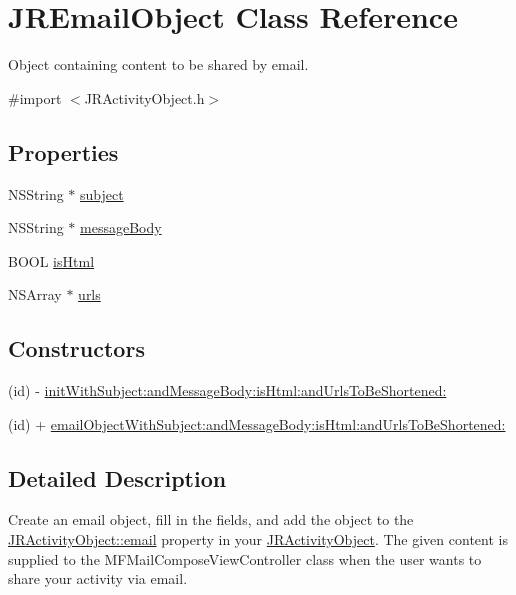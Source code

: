 \hypertarget{interface_j_r_email_object}{
\section{JREmailObject Class Reference}
\label{interface_j_r_email_object}
}


Object containing content to be shared by email.  




{\ttfamily \#import $<$JRActivityObject.h$>$}

\subsection*{Properties}
\begin{DoxyCompactItemize}
\item 
NSString $\ast$ \hyperlink{interface_j_r_email_object_a618a23c34ede4a4eb56ed6cf05d91b64}{subject}
\item 
NSString $\ast$ \hyperlink{interface_j_r_email_object_ad0e6a07cb2aec3cf6eee75d2ace32e7d}{messageBody}
\item 
BOOL \hyperlink{interface_j_r_email_object_af372942f67fba5e93fb2b53f4ee8a3c5}{isHtml}
\item 
NSArray $\ast$ \hyperlink{interface_j_r_email_object_a3f274a24ce4145b46cb5f0cda50378ce}{urls}
\end{DoxyCompactItemize}
\subsection*{Constructors}
\label{_amgrp559a25fdb98a7d1fd1c3771ac568d5e9}
 \begin{DoxyCompactItemize}
\item 
(id) -\/ \hyperlink{interface_j_r_email_object_aa911e84f7b1f7e8c4fd15009dbdc6783}{initWithSubject:andMessageBody:isHtml:andUrlsToBeShortened:}
\item 
(id) + \hyperlink{interface_j_r_email_object_aea1535d69b58d30295e5b88f93d0a474}{emailObjectWithSubject:andMessageBody:isHtml:andUrlsToBeShortened:}
\end{DoxyCompactItemize}


\subsection{Detailed Description}
Create an email object, fill in the fields, and add the object to the \hyperlink{interface_j_r_activity_object_aa26818070a5987c70ef14700d6f6c72c}{JRActivityObject::email} property in your \hyperlink{interface_j_r_activity_object}{JRActivityObject}. The given content is supplied to the MFMailComposeViewController class when the user wants to share your activity via email.

